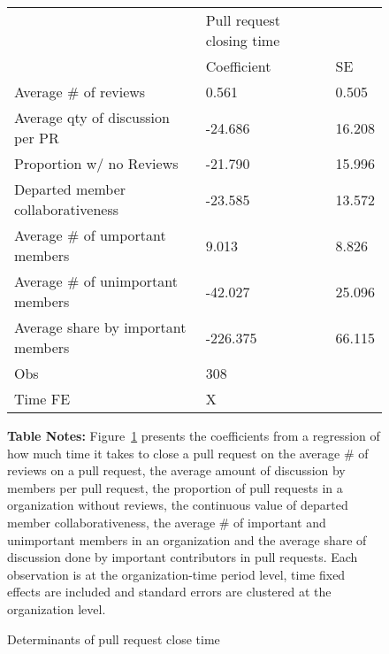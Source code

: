 \begin{figure}[!htbp]
\centering
\caption{Determinants of pull request close time}
\label{fig:close_time_regression}
{\small
\begin{tabular}{lll}
\hline
& Pull request closing time &  \\ \cmidrule(lr){2-3}
& Coefficient & SE \\ \hline
Average \# of reviews & 0.561 & 0.505 \\
Average qty of discussion per PR & -24.686 & 16.208 \\
Proportion w/ no Reviews & -21.790 & 15.996 \\
Departed member collaborativeness & -23.585 & 13.572 \\
Average \# of umportant members & 9.013 & 8.826 \\
Average \# of unimportant members & -42.027 & 25.096 \\
Average share by important members & -226.375 & 66.115 \\
\hdashline
Obs & 308 & \\
Time FE & X &  \\
\hline
\end{tabular}
}
  \begin{minipage}{\textwidth}
    \small
    \textbf{Table Notes:}  Figure~\ref{fig:close_time_regression} presents the coefficients from a regression of how much time it takes to close a pull request on the average \# of reviews on a pull request, the average amount of discussion  by members per pull request, the proportion of pull requests in a organization without reviews, the continuous value of departed member collaborativeness, the average \# of important and unimportant members in an organization and the average share of discussion done by important contributors in pull requests.
    Each observation is at the organization-time period level, time fixed effects are included and standard errors are clustered at the organization level. 
  \end{minipage}

\end{figure}

